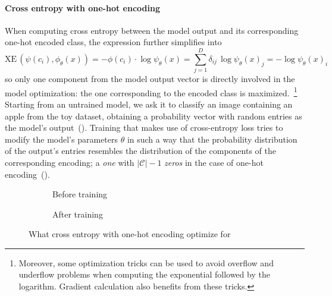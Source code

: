 \paragraph{Cross entropy with one-hot encoding} When computing cross entropy between the model output and its corresponding one-hot encoded class, the expression further simplifies into
\begin{equation*}
  \textrm{XE} \, (\psi(c_i),\phi_\theta(x))
  = - \phi(c_i) \cdot \log \psi_\theta(x)
  = \sum_{j = 1}^D \delta_{ij} \, \log \psi_\theta(x)_j
  = - \log \psi_\theta(x)_i
  \label{eq:cross-entropy-one-hot-encoding}
\end{equation*}
so only one component from the model output vector is directly involved in the model optimization: the one corresponding to the encoded class is maximized.~\footnote{Moreover, some optimization tricks can be used to avoid overflow and underflow problems when computing the exponential followed by the logarithm. Gradient calculation also benefits from these tricks.} %
Starting from an untrained model, we ask it to classify an image containing an apple from the toy dataset, obtaining a probability vector with random entries as the model's output~(). Training that makes use of cross-entropy loss tries to modify the model's parameters $\theta$ in such a way that the probability distribution of the output's entries resembles the distribution of the components of the corresponding encoding; a \emph{one} with $|\mathcal{C}| - 1$ \emph{zeros} in the case of one-hot encoding~().
\begin{figure}[htbp]
  \centering
  \begin{subfigure}{0.45\textwidth}
    \centering
    \begin{minipage}{\textwidth}
      \resizebox{\linewidth}{!}{}
    \end{minipage}
    \caption{Before training}
    \label{fig:03/xe-onehot-before}
  \end{subfigure}
  \begin{subfigure}{0.45\textwidth}
    \centering
    \begin{minipage}{\textwidth}
      \resizebox{\linewidth}{!}{}
    \end{minipage}
    \caption{After training}
    \label{fig:03/xe-onehot-after}
  \end{subfigure}
  \caption{What cross entropy with one-hot encoding optimize for} %
\end{figure}

